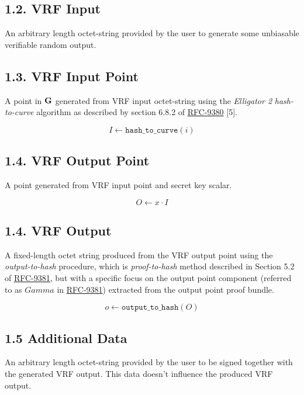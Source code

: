 \documentclass[
]{article}
\begin{document}
\subsection{1.2. VRF Input}\label{vrf-input}

An arbitrary length octet-string provided by the user to generate some
unbiasable verifiable random output.

\subsection{1.3. VRF Input Point}\label{vrf-input-point}

A point in \(\bold{G}\) generated from VRF input octet-string using the
\emph{Elligator 2} \emph{hash-to-curve} algorithm as described by
section 6.8.2 of
\href{https://datatracker.ietf.org/doc/rfc9380}{RFC-9380} {[}5{]}.

\[I \gets \texttt{hash\_to\_curve}(i)\]

\subsection{1.4. VRF Output Point}\label{vrf-output-point}

A point generated from VRF input point and secret key scalar.

\[O \gets x \cdot I\]

\subsection{1.4. VRF Output}\label{vrf-output}

A fixed-length octet string produced from the VRF output point using the
\emph{output-to-hash} procedure, which is \emph{proof-to-hash} method
described in Section 5.2 of
\href{https://datatracker.ietf.org/doc/rfc9381}{RFC-9381}, but with a
specific focus on the output point component (referred to as \(Gamma\)
in \href{https://datatracker.ietf.org/doc/rfc9381}{RFC-9381}) extracted
from the output point proof bundle.

\[o \gets \texttt{output\_to\_hash}(O)\]

\subsection{1.5 Additional Data}\label{additional-data}

An arbitrary length octet-string provided by the user to be signed
together with the generated VRF output. This data doesn't influence the
produced VRF output.
\end{document}
